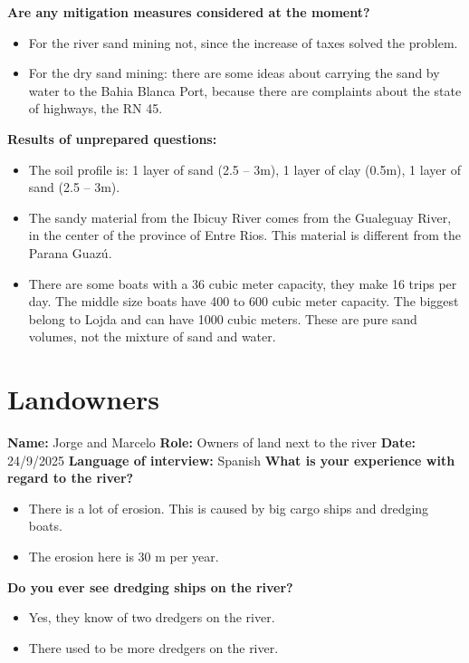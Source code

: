 \textbf{Are any mitigation measures considered at the moment?}
\begin{itemize}
    \item For the river sand mining not, since the increase of taxes solved the problem.
    \item For the dry sand mining: there are some ideas about carrying the sand by water to the Bahia Blanca Port, because there are complaints about the state of highways, the RN 45.
\end{itemize}

\textbf{Results of unprepared questions:}
\begin{itemize}
    \item The soil profile is: 1 layer of sand (2.5 – 3m), 1 layer of clay (0.5m), 1 layer of sand (2.5 – 3m).
    \item The sandy material from the Ibicuy River comes from the Gualeguay River, in the center of the province of Entre Rios. This material is different from the Parana Guazú.
    \item There are some boats with a 36 cubic meter capacity, they make 16 trips per day. The middle size boats have 400 to 600 cubic meter capacity. The biggest belong to Lojda and can have 1000 cubic meters. These are pure sand volumes, not the mixture of sand and water.
\end{itemize}

\section{Landowners}
\textbf{Name:} Jorge and Marcelo \newline
\textbf{Role:} Owners of land next to the river \newline
\textbf{Date:} 24/9/2025 \newline
\textbf{Language of interview:} Spanish \newline \newline
\textbf{What is your experience with regard to the river?}
\begin{itemize}
    \item There is a lot of erosion. This is caused by big cargo ships and dredging boats.
    \item The erosion here is 30 m per year.
\end{itemize}

\textbf{Do you ever see dredging ships on the river?}
\begin{itemize}
    \item Yes, they know of two dredgers on the river.
    \item There used to be more dredgers on the river.
\end{itemize}

